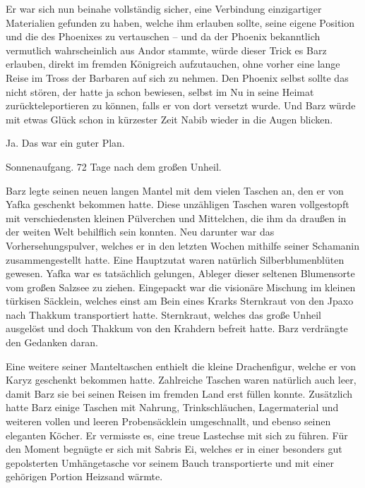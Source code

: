 Er war sich nun beinahe vollständig sicher, eine Verbindung einzigartiger Materialien gefunden zu haben, welche ihm erlauben sollte, seine eigene Position und die des Phoenixes zu vertauschen – und da der Phoenix bekanntlich vermutlich wahrscheinlich aus Andor stammte, würde dieser Trick es Barz erlauben, direkt im fremden Königreich aufzutauchen, ohne vorher eine lange Reise im Tross der Barbaren auf sich zu nehmen. Den Phoenix selbst sollte das nicht stören, der hatte ja schon bewiesen, selbst im Nu in seine Heimat zurückteleportieren zu können, falls er von dort versetzt wurde. Und Barz würde mit etwas Glück schon in kürzester Zeit Nabib wieder in die Augen blicken.

Ja. Das war ein guter Plan.



\trennzeichen



Sonnenaufgang. 72 Tage nach dem großen Unheil.\bigskip



Barz legte seinen neuen langen Mantel mit dem vielen Taschen an, den er von Yafka geschenkt bekommen hatte. Diese unzähligen Taschen waren vollgestopft mit verschiedensten kleinen Pülverchen und Mittelchen, die ihm da draußen in der weiten Welt behilflich sein konnten. Neu darunter war das Vorhersehungspulver, welches er in den letzten Wochen mithilfe seiner Schamanin zusammengestellt hatte. Eine Hauptzutat waren natürlich Silberblumenblüten gewesen. Yafka war es tatsächlich gelungen, Ableger dieser seltenen Blumensorte vom großen Salzsee zu ziehen. Eingepackt war die visionäre Mischung im kleinen türkisen Säcklein, welches einst am Bein eines Krarks Sternkraut von den Jpaxo nach Thakkum transportiert hatte. Sternkraut, welches das große Unheil ausgelöst und doch Thakkum von den Krahdern befreit hatte. Barz verdrängte den Gedanken daran.

Eine weitere seiner Manteltaschen enthielt die kleine Drachenfigur, welche er von Karyz geschenkt bekommen hatte. Zahlreiche Taschen waren natürlich auch leer, damit Barz sie bei seinen Reisen im fremden Land erst füllen konnte. Zusätzlich hatte Barz einige Taschen mit Nahrung, Trinkschläuchen, Lagermaterial und weiteren vollen und leeren Probensäcklein umgeschnallt, und ebenso seinen eleganten Köcher. Er vermisste es, eine treue Lastechse mit sich zu führen. Für den Moment begnügte er sich mit Sabris Ei, welches er in einer besonders gut gepolsterten Umhängetasche vor seinem Bauch transportierte und mit einer gehörigen Portion Heizsand wärmte.

